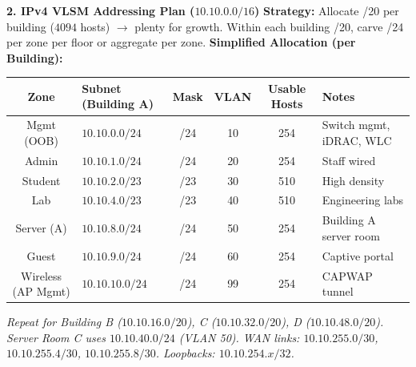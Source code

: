 \documentclass[11pt]{article}
\begin{document}
\begin{exoresolu}
\noindent\textbf{2. IPv4 VLSM Addressing Plan ($10.10.0.0/16$)}
\textbf{Strategy:} Allocate /20 per building ($4094$ hosts) $\rightarrow$ plenty for growth. Within each building /20, carve /24 per zone per floor or aggregate per zone.
\textbf{Simplified Allocation (per Building):}

\begin{center}
\begin{tabularx}{\linewidth}{|c|l|c|c|c|X|}
\hline
\rowcolor{popblueL}
\textbf{Zone} & \textbf{Subnet (Building A)} & \textbf{Mask} & \textbf{VLAN} & \textbf{Usable Hosts} & \textbf{Notes} \\
\hline
Mgmt (OOB) & $10.10.0.0/24$ & /24 & 10 & 254 & Switch mgmt, iDRAC, WLC \\
Admin & $10.10.1.0/24$ & /24 & 20 & 254 & Staff wired \\
Student & $10.10.2.0/23$ & /23 & 30 & 510 & High density \\
Lab & $10.10.4.0/23$ & /23 & 40 & 510 & Engineering labs \\
Server (A) & $10.10.8.0/24$ & /24 & 50 & 254 & Building A server room \\
Guest & $10.10.9.0/24$ & /24 & 60 & 254 & Captive portal \\
Wireless (AP Mgmt) & $10.10.10.0/24$ & /24 & 99 & 254 & CAPWAP tunnel \\
\hline
\end{tabularx}
\end{center}
\textit{Repeat for Building B ($10.10.16.0/20$), C ($10.10.32.0/20$), D ($10.10.48.0/20$). Server Room C uses $10.10.40.0/24$ (VLAN 50). WAN links: $10.10.255.0/30$, $10.10.255.4/30$, $10.10.255.8/30$. Loopbacks: $10.10.254.x/32$.}


\end{exoresolu}
\end{document}
